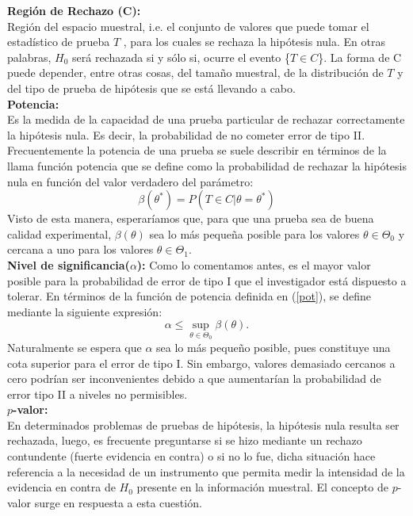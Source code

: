 \documentclass[11pt,letterpaper]{article}
\begin{document}
\textbf{Región de Rechazo (C): }\\
Región del espacio muestral, i.e. el conjunto de valores que puede tomar el estadístico de prueba $T$ , para los cuales se rechaza la hipótesis nula. En otras palabras,
$H_0$ será rechazada si y sólo si, ocurre el evento \{$T \in C$\}. La forma de C puede depender, entre
otras cosas, del tamaño muestral, de la distribución de $T$ y del tipo de prueba de hipótesis que se
está llevando a cabo.\\

\textbf{Potencia:} \\
Es la medida de la capacidad de una prueba particular de rechazar correctamente la
hipótesis nula. Es decir, la probabilidad de no cometer error de tipo II. Frecuentemente la potencia de una prueba
se suele describir en términos de la llama función potencia que se define como la probabilidad de
rechazar la hipótesis nula en función del valor verdadero del parámetro:
\begin{equation}
	\beta(\theta^*)=P(T\in C|\theta=\theta^*)\label{pot}
\end{equation}
Visto de esta manera, esperaríamos que, para que una prueba sea de buena calidad experimental,
$\beta(\theta)$ sea lo más pequeña posible para los valores $\theta\in\Theta_0$  y cercana a uno para los valores $\theta \in \Theta_1$.\\

\textbf{Nivel de significancia($\alpha$): }Como lo comentamos antes, es el mayor valor posible para la probabilidad de error de tipo I
que el investigador está dispuesto a tolerar. En términos de la función de potencia definida en (\ref{pot}),
se define mediante la siguiente expresión: 
\begin{equation}
	\alpha\leq\sup_{\theta\in\Theta_0} \beta(\theta).
\end{equation}
Naturalmente se espera que $\alpha$ sea lo más pequeño posible, pues constituye una cota superior para
el error de tipo I. Sin embargo, valores demasiado cercanos a cero podrían ser inconvenientes
debido a que aumentarían la probabilidad de error tipo II a niveles no permisibles.\\

\textbf{$p$-valor: } \\
En determinados problemas de pruebas de hipótesis, la hipótesis nula resulta ser
rechazada, luego, es frecuente preguntarse si se hizo mediante un rechazo contundente (fuerte evidencia
en contra) o si no lo fue, dicha situación hace referencia a la necesidad de un instrumento que
permita medir la intensidad de la evidencia en contra de $H_0$ presente en la información muestral.
El concepto de $p$-valor surge en respuesta a esta cuestión.
\end{document}
